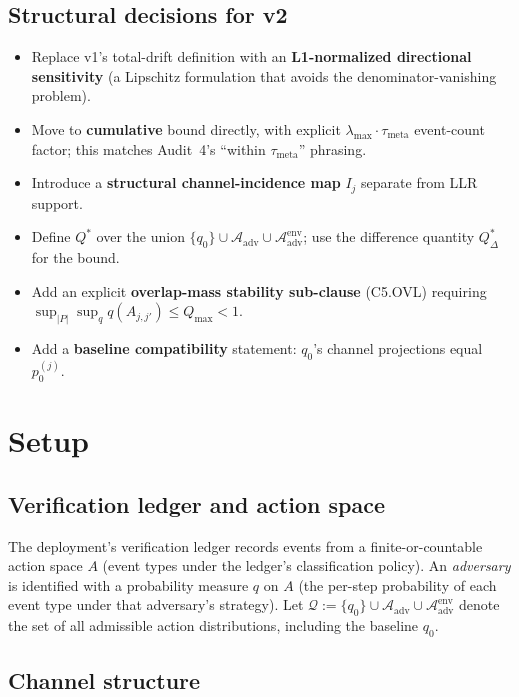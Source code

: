 \documentclass{article}
\newcommand{\lammax}{\lambda_{\max}}
\newcommand{\taumeta}{\tau_{\mathrm{meta}}}
\begin{document}
\subsection{Structural decisions for v2}

\begin{itemize}
\item Replace v1's total-drift definition with an
  \textbf{L1-normalized directional sensitivity} (a Lipschitz
  formulation that avoids the denominator-vanishing problem).
\item Move to \textbf{cumulative} bound directly, with explicit
  $\lammax \cdot \taumeta$ event-count factor; this matches Audit~4's
  ``within $\taumeta$'' phrasing.
\item Introduce a \textbf{structural channel-incidence map} $I_j$
  separate from LLR support.
\item Define $Q^*$ over the union $\{q_0\} \cup \mathcal{A}_{\mathrm{adv}}
  \cup \mathcal{A}_{\mathrm{adv}}^{\mathrm{env}}$; use the
  difference quantity $Q_\Delta^*$ for the bound.
\item Add an explicit \textbf{overlap-mass stability sub-clause}
  (C5.OVL) requiring $\sup_{|P|} \sup_q q(A_{j,j'}) \leq Q_{\max} <
  1$.
\item Add a \textbf{baseline compatibility} statement: $q_0$'s
  channel projections equal $p_0^{(j)}$.
\end{itemize}

\section{Setup}

\subsection{Verification ledger and action space}

The deployment's verification ledger records events from a
finite-or-countable action space $A$ (event types under the
ledger's classification policy).  An \emph{adversary} is identified
with a probability measure $q$ on $A$ (the per-step probability of
each event type under that adversary's strategy).  Let $\mathcal{Q}
:= \{q_0\} \cup \mathcal{A}_{\mathrm{adv}} \cup
\mathcal{A}_{\mathrm{adv}}^{\mathrm{env}}$ denote the set of all
admissible action distributions, including the baseline $q_0$.

\subsection{Channel structure}
\end{document}
